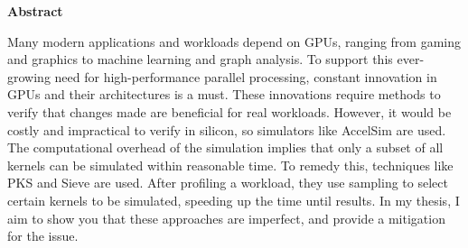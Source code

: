 \thispagestyle{plain}
\begin{center}
    \textbf{Abstract}
\end{center}

Many modern applications and workloads depend on GPUs, ranging from gaming and graphics to machine learning and graph analysis.
To support this ever-growing need for high-performance parallel processing, constant innovation in GPUs and their architectures is a must.
These innovations require methods to verify that changes made are beneficial for real workloads.
However, it would be costly and impractical to verify in silicon, so simulators like AccelSim\cite{accelsim} are used.
The computational overhead of the simulation implies that only a subset of all kernels can be simulated within reasonable time.
To remedy this, techniques like PKS\cite{pks} and Sieve\cite{sieve} are used.
After profiling a workload, they use sampling to select certain kernels to be simulated, speeding up the time until results.
In my thesis, I aim to show you that these approaches are imperfect, and provide a mitigation for the issue.
